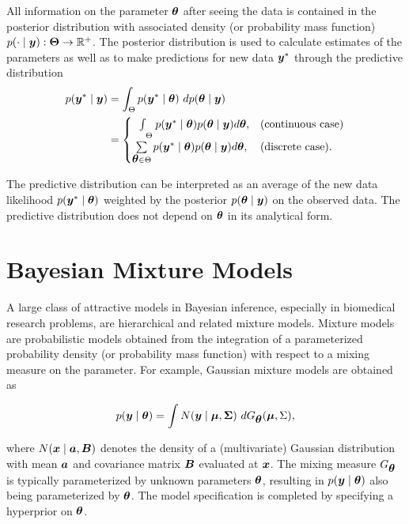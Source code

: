 All information on the parameter $\mbox{\boldmath $\theta$}$ after seeing the data is contained in the posterior distribution with associated density (or probability mass function) $p(\cdot\mid \mbox{\boldmath $y$}): \mbox{\boldmath $\Theta$} \rightarrow \mathbb{R^+}$. The posterior distribution is used to calculate estimates of the parameters as well as to make predictions for new data $\mbox{\boldmath $y$}^*$ through the predictive distribution 
\begin{align*}
p(\bfy^* \mid \bfy) &= \int_{\Theta} p(\bfy^* \mid \bftheta)\ dp(\bftheta \mid \bfy)\\
&=\begin{cases}
\int\limits_{\ \ \ \ \Theta} p(\bfy^* \mid \bftheta)p(\bftheta \mid \bfy)d\bftheta, &\mbox{(continuous case)}\\
\sum\limits_{\bftheta \in \Theta} p(\bfy^* \mid \bftheta)p(\bftheta \mid \bfy)d\bftheta, &\mbox{(discrete case)}.
\end{cases}
\end{align*}

\noindent The predictive distribution can be interpreted as an average of the new data likelihood $p(\mbox{\boldmath $y$}^* \mid \mbox{\boldmath $\theta$})$ weighted by the posterior $p(\mbox{\boldmath $\theta$} \mid \mbox{\boldmath $y$})$ on the observed data. The predictive distribution does not depend on $\mbox{\boldmath $\theta$}$ in its analytical form.


\section{Bayesian Mixture Models}

A large class of attractive models in Bayesian inference, especially in biomedical research problems, are hierarchical and related mixture models. Mixture models are probabilistic models obtained from the integration of a parameterized probability density (or probability mass function) with respect to a mixing measure on the parameter. For example, Gaussian mixture models are obtained as

\begin{equation}
p(\mbox{\boldmath $y$} \mid \mbox{\boldmath $\theta$}) = \int  N(\mbox{\boldmath $y$} \mid \mbox{\boldmath $\mu$}, \mbox{\boldmath $\Sigma$}) \ dG_{\mbox{\boldmath $\theta$}}(\mbox{\boldmath $\mu$}, \Sigma), 
\label{eq:mixture_general}
\end{equation}

\noindent where $N(\mbox{\boldmath $x$} \mid \mbox{\boldmath $a$},  \mbox{\boldmath $B$})$ denotes the density of a (multivariate) Gaussian distribution with mean $\mbox{\boldmath $a$}$ and covariance matrix $\mbox{\boldmath $B$}$ evaluated at $\mbox{\boldmath $x$}$. The mixing measure $G_{\mbox{\boldmath $\theta$}}$ is typically parameterized by unknown parameters $\mbox{\boldmath $\theta$}$, resulting in $p(\mbox{\boldmath $y$} \mid \mbox{\boldmath $\theta$})$ also being parameterized by $\mbox{\boldmath $\theta$}$. The model specification is completed by specifying a hyperprior on $\mbox{\boldmath $\theta$}$. 

